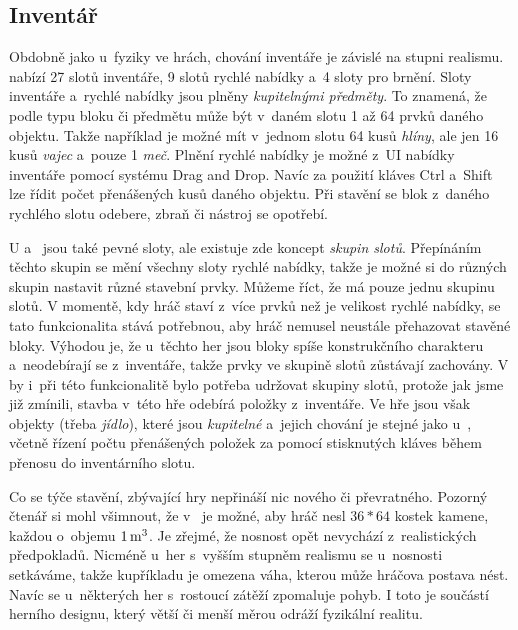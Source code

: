 \subsection{Inventář}
\label{subsec:inventory}

Obdobně jako u~fyziky ve hrách, chování inventáře je závislé na stupni realismu. \MC{} nabízí 27 slotů inventáře, 9 slotů rychlé nabídky a~4 sloty pro brnění. Sloty inventáře a~rychlé nabídky jsou plněny \textit{kupitelnými předměty}. To znamená, že podle typu bloku či předmětu může být v~daném slotu 1 až 64 prvků daného objektu. Takže například je možné mít v~jednom slotu 64 kusů \textit{hlíny}, ale jen 16 kusů \textit{vajec} a~pouze 1 \textit{meč}. Plnění rychlé nabídky je možné z~UI nabídky inventáře pomocí systému Drag and Drop. Navíc za použití kláves Ctrl a~Shift lze řídit počet přenášených kusů daného objektu. Při stavění se blok z~daného rychlého slotu odebere, zbraň či nástroj se opotřebí.

U \ME{} a~\SE{} jsou také pevné sloty, ale existuje zde koncept \textit{skupin slotů}. Přepínáním těchto skupin se mění všechny sloty rychlé nabídky, takže je možné si do různých skupin nastavit různé stavební prvky. Můžeme říct, že \MC{} má pouze jednu skupinu slotů. V momentě, kdy hráč staví z~více prvků než je velikost rychlé nabídky, se tato funkcionalita stává potřebnou, aby hráč nemusel neustále přehazovat stavěné bloky. Výhodou je, že u~těchto her jsou bloky spíše konstrukčního charakteru a~neodebírají se z~inventáře, takže prvky ve skupině slotů zůstávají zachovány. V  by i~při této funkcionalitě bylo potřeba udržovat skupiny slotů, protože jak jsme již zmínili, stavba v~této hře odebírá položky z~inventáře. Ve hře jsou však objekty (třeba \textit{jídlo}), které jsou \textit{kupitelné} a~jejich chování je stejné jako u~, včetně řízení počtu přenášených položek za pomocí stisknutých kláves během přenosu do inventárního slotu.

Co se týče stavění, zbývající hry nepřináší nic nového či převratného. Pozorný čtenář si mohl všimnout, že v~ je možné, aby hráč nesl $36*64$ kostek kamene, každou o~objemu $1\,\rm m^3$. Je zřejmé, že nosnost opět nevychází z~realistických předpokladů. Nicméně u~her s~vyšším stupněm realismu se u~nosnosti setkáváme, takže kupříkladu je omezena váha, kterou může hráčova postava nést. Navíc se u~některých her s~rostoucí zátěží zpomaluje pohyb. I toto je součástí herního designu, který větší či menší měrou odráží fyzikální realitu.


